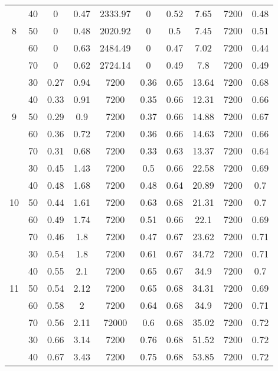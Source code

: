 \documentclass{itor}
\theoremstyle{definition}
\theoremstyle{remark}
\begin{document}
\begin{table}[htbp]
\begin{tabular}{|c|c|cccc|cccc|}
          & 40    & 0     & 0.47  & 2333.97 & 0     & 0.52  & 7.65  & 7200  & 0.48 \\
    8     & 50    & 0     & 0.48  & 2020.92 & 0     & 0.5   & 7.45  & 7200  & 0.51 \\
          & 60    & 0     & 0.63  & 2484.49 & 0     & 0.47  & 7.02  & 7200  & 0.44 \\
          & 70    & 0     & 0.62  & 2724.14 & 0     & 0.49  & 7.8   & 7200  & 0.49 \\
    \midrule
          & 30    & 0.27  & 0.94  & 7200  & 0.36  & 0.65  & 13.64 & 7200  & 0.68 \\
          & 40    & 0.33  & 0.91  & 7200  & 0.35  & 0.66  & 12.31 & 7200  & 0.66 \\
    9     & 50    & 0.29  & 0.9   & 7200  & 0.37  & 0.66  & 14.88 & 7200  & 0.67 \\
          & 60    & 0.36  & 0.72  & 7200  & 0.36  & 0.66  & 14.63 & 7200  & 0.66 \\
          & 70    & 0.31  & 0.68  & 7200  & 0.33  & 0.63  & 13.37 & 7200  & 0.64 \\
    \midrule
          & 30    & 0.45  & 1.43  & 7200  & 0.5   & 0.66  & 22.58 & 7200  & 0.69 \\
          & 40    & 0.48  & 1.68  & 7200  & 0.48  & 0.64  & 20.89 & 7200  & 0.7 \\
    10    & 50    & 0.44  & 1.61  & 7200  & 0.63  & 0.68  & 21.31 & 7200  & 0.7 \\
          & 60    & 0.49  & 1.74  & 7200  & 0.51  & 0.66  & 22.1  & 7200  & 0.69 \\
          & 70    & 0.46  & 1.8   & 7200  & 0.47  & 0.67  & 23.62 & 7200  & 0.71 \\
    \midrule
          & 30    & 0.54  & 1.8   & 7200  & 0.61  & 0.67  & 34.72 & 7200  & 0.71 \\
          & 40    & 0.55  & 2.1   & 7200  & 0.65  & 0.67  & 34.9  & 7200  & 0.7 \\
    11    & 50    & 0.54  & 2.12  & 7200  & 0.65  & 0.68  & 34.31 & 7200  & 0.69 \\
          & 60    & 0.58  & 2     & 7200  & 0.64  & 0.68  & 34.9  & 7200  & 0.71 \\
          & 70    & 0.56  & 2.11  & 72000 & 0.6   & 0.68  & 35.02 & 7200  & 0.72 \\
    \midrule
          & 30    & 0.66  & 3.14  & 7200  & 0.76  & 0.68  & 51.52 & 7200  & 0.72 \\
          & 40    & 0.67  & 3.43  & 7200  & 0.75  & 0.68  & 53.85 & 7200  & 0.72 \\

\end{tabular}
\end{table}
\end{document}
